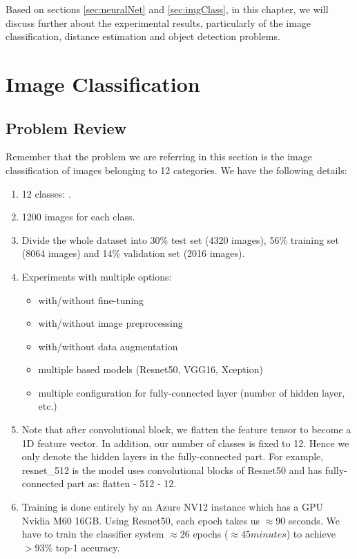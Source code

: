 \label{chap:ExpRes}
Based on sections \ref{sec:neuralNet} and \ref{sec:imgClass}, in this chapter, we will discuss further about the experimental results, particularly of the image classification, distance estimation and object detection problems.

\section{Image Classification}
\label{sec:imgClasEval}
\subsection{Problem Review}
Remember that the problem we are referring in this section is the image classification of images belonging to 12 categories. We have the following details:
\begin{enumerate}
	\item 12 classes: .
	\item 1200 images for each class.
	\item Divide the whole dataset into 30\% test set (4320 images), 56\% training set (8064 images) and 14\% validation set (2016 images).
	\item Experiments with multiple options: 
	\begin{itemize}
		\item with/without fine-tuning
		\item with/without image preprocessing
		\item with/without data augmentation
		\item multiple based models (Resnet50, VGG16, Xception)
		\item multiple configuration for fully-connected layer (number of hidden layer, etc.)
	\end{itemize} 
	\item Note that after convolutional block, we flatten the feature tensor to become a 1D feature vector. In addition, our number of classes is fixed to 12. Hence we only denote the hidden layers in the fully-connected part. For example, resnet\_512 is the model uses convolutional blocks of Resnet50 and has fully-connected part as: flatten - 512 - 12. 
	\item Training is done entirely by an Azure NV12 instance which has a GPU Nvidia M60 16GB. Using Resnet50, each epoch takes us $\approx 90$ seconds. We have to train the classifier system $\approx 26$ epochs ($\approx 45 minutes$) to achieve $ > 93\%$ top-1 accuracy.
\end{enumerate}

